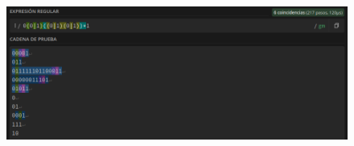 \documentclass[11pt]{report}
\begin{document}
  \begin{figure}[H]
    \centering
    \includegraphics[scale=0.5]{img/modificacion_03_2.png} 
  \end{figure}
\end{document}
